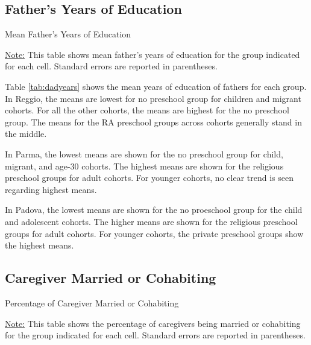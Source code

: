 \documentclass[12pt]{article}
\begin{document}
\subsection{Father's Years of Education}
\begin{table}[H]
\caption{Mean Father's Years of Education} \label{tab:dadyears}
\begin{center}
\scalebox{0.8}{

}
\end{center}
\begin{footnotesize}
\vspace{0.5mm} 

\underline{Note:} This table shows mean father's years of education for the group indicated for each cell. Standard errors are reported in parentheses. 
\end{footnotesize}
\end{table}

Table \ref{tab:dadyears} shows the mean years of education of fathers for each group. In Reggio, the means are lowest for no preschool group for children and migrant cohorts. For all the other cohorts, the means are highest for the no preschool group. The means for the RA preschool groups across cohorts generally stand in the middle. 

In Parma, the lowest means are shown for the no preschool group for child, migrant, and age-30 cohorts. The highest means are shown for the religious preschool groups for adult cohorts. For younger cohorts, no clear trend is seen regarding highest means.

In Padova, the lowest means are shown for the no proeschool group for the child and adolescent cohorts. The higher means are shown for the religious preschool groups for adult cohorts. For younger cohorts, the private preschool groups show the highest means.

\subsection{Caregiver Married or Cohabiting}
\begin{table}[H]
\caption{Percentage of Caregiver Married or Cohabiting} \label{tab:married}
\begin{center}
\scalebox{0.8}{

}
\end{center}
\begin{footnotesize}
\vspace{0.5mm} 

\underline{Note:} This table shows the percentage of caregivers being married or cohabiting for the group indicated for each cell. Standard errors are reported in parentheses.
\end{footnotesize}
\end{table}
\end{document}
